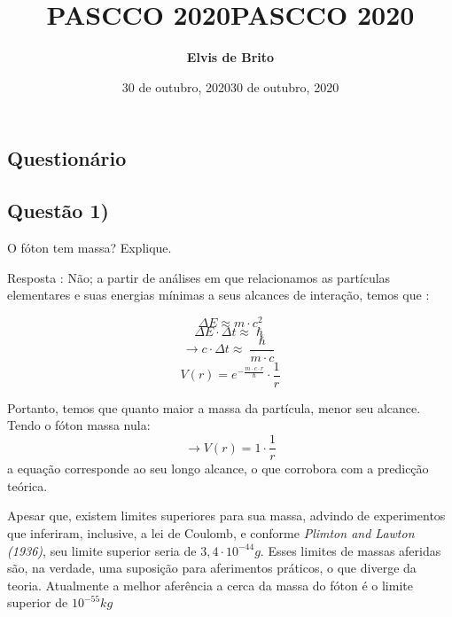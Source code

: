 \documentclass{article}
\title{\textbf{PASCCO 2020}}
\author{\textbf{Elvis de Brito}}
\date{30 de outubro, 2020}
\title{{\fontfamily{put}\selectfont PASCCO 2020}
}
\author{\fontfamily{put}\selectfont {Elvis de Brito}
}
\date{30 de outubro, 2020}
\begin{document}
\maketitle

\begin{center}

\section*{\selectfont Questionário
}


\end{center}


    \begin{boxx}
    \subsection*{Questão 1)}
    O fóton tem massa? Explique.
\end{boxx}
Resposta : 
 Não; a partir de análises em que relacionamos as partículas elementares e suas energias mínimas a seus alcances de interação, temos que :
 
 \begin{equation}
    \Delta E \approx m\cdot c^2 
 \end{equation}
 \begin{equation}
     \Delta E \cdot \Delta t \approx \hslash
 \end{equation}
 \begin{equation}
     \longrightarrow c \cdot \Delta t \approx \frac{\hslash}{m \cdot c}
 \end{equation}
 \begin{equation}
     V(r)=e^{-\frac{m\cdot c\cdot r}{\hslash}} \cdot \frac{1}{r}
 \end{equation}
 
     Portanto, temos que quanto maior a massa da partícula, menor seu alcance. Tendo o fóton massa nula:
     \begin{equation*}
       \longrightarrow  V(r) = 1 \cdot \frac{1}{r}
     \end{equation*}
     a equação corresponde ao seu longo alcance, o que corrobora com a predicção teórica.
     
     Apesar que, existem limites superiores para sua massa, advindo de experimentos que inferiram, inclusive, a lei de Coulomb, e conforme  \textit{Plimton and Lawton (1936)}, seu limite superior seria de $3,4\cdot10^{-44}\si{g}$. Esses limites de massas aferidas são, na verdade, uma suposição para aferimentos práticos, o que diverge da teoria. Atualmente a melhor aferência a cerca da massa do fóton é o limite superior de $10^{-55}\si{kg}$  
\end{document}
